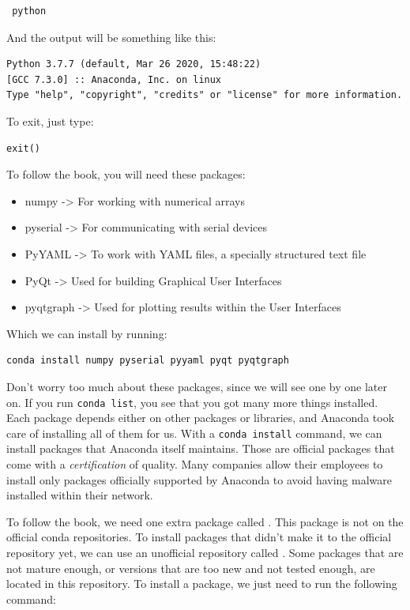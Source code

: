 \begin{verbatim}
 python
\end{verbatim}

And the output will be something like this:

\begin{verbatim}
Python 3.7.7 (default, Mar 26 2020, 15:48:22)
[GCC 7.3.0] :: Anaconda, Inc. on linux
Type "help", "copyright", "credits" or "license" for more information.
\end{verbatim}

To exit, just type:

\begin{verbatim}
exit()
\end{verbatim}

To follow the book, you will need these packages:

\begin{itemize}
 \item numpy -> For working with numerical arrays
 \item pyserial -> For communicating with serial devices
 \item PyYAML -> To work with YAML files, a specially structured text file
 \item PyQt -> Used for building Graphical User Interfaces
 \item pyqtgraph -> Used for plotting results within the User Interfaces
\end{itemize}

Which we can install by running:

\begin{verbatim}
conda install numpy pyserial pyyaml pyqt pyqtgraph
\end{verbatim}

Don't worry too much about these packages, since we will see one by one later on. If you run \texttt{conda list}, you see that you got many more things installed. Each package depends either on other packages or libraries, and Anaconda took care of installing all of them for us. With a \texttt{conda install} command, we can install packages that Anaconda itself maintains. Those are official packages that come with a \emph{certification} of quality. Many companies allow their employees to install only packages officially supported by Anaconda to avoid having malware installed within their network.

To follow the book, we need one extra package called . This package is not on the official conda repositories. To install packages that didn't make it to the official repository yet, we can use an unofficial repository called . Some packages that are not mature enough, or versions that are too new and not tested enough, are located in this repository. To install a package, we just need to run the following command:

